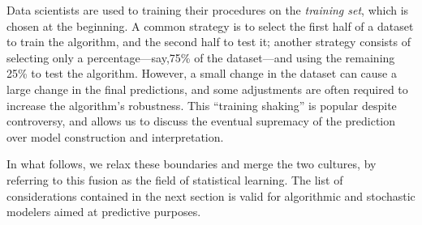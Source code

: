 \documentclass{statsoc}
\begin{document}

Data scientists are used to training their procedures on the \emph{training set}, which is chosen at the beginning. A common strategy is to select the first half of a 
dataset to train the algorithm, and the second half to test it; another strategy consists of selecting only a percentage---say,75\% of the dataset---and using the remaining 25\% to  test the algorithm. However, a small change in the dataset can cause a large change in the final predictions, and some adjustments are often required to increase the algorithm's robustness.  This ``training shaking'' is popular despite controversy, and allows us to discuss the eventual supremacy of the prediction over model construction and interpretation.


In what follows, we relax these boundaries and merge the two cultures, by referring to this fusion as the field of statistical learning. The list of considerations contained in the next section is valid for algorithmic and stochastic modelers aimed at predictive purposes.


\end{document}

